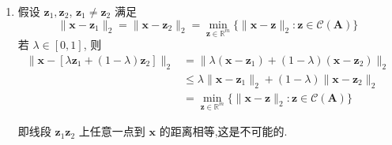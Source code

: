 \documentclass[11pt,letter,notitlepage]{article}
\begin{document}
\begin{solution}
    \begin{enumerate}
        \item 假设 $\mathbf{z}_1, \mathbf{z}_2$, $\mathbf{z}_1\neq\mathbf{z}_2$ 满足
              $$ \|\mathbf{x}-\mathbf{z}_1\|_2=\|\mathbf{x}-\mathbf{z}_2\|_2 = \min_{\mathbf{z}\in\mathbb{R}^m} \{\|\mathbf{x}-\mathbf{z}\|_2: \mathbf{z}\in\mathcal{C}(\mathbf{A})\}$$
              若 $\lambda\in[0,1]$, 则
              $$\begin{aligned}
                      \|\mathbf{x}-[\lambda \mathbf{z}_1+(1-\lambda)\mathbf{z}_2]\|_2
                       & =\|\lambda(\mathbf{x}-\mathbf{z}_1)+(1-\lambda)(\mathbf{x}-\mathbf{z}_2)\|_2                             \\
                       & \leq \lambda \|\mathbf{x}-\mathbf{z}_1\|_2+(1-\lambda)\|\mathbf{x}-\mathbf{z}_2\|_2                      \\
                       & = \min_{\mathbf{z}\in\mathbb{R}^m} \{\|\mathbf{x}-\mathbf{z}\|_2: \mathbf{z}\in\mathcal{C}(\mathbf{A})\}
                  \end{aligned}$$

              即线段 $\mathbf{z}_1\mathbf{z}_2$ 上任意一点到 $\mathbf{x}$ 的距离相等,这是不可能的.


\end{enumerate}
\end{solution}
\end{document}
